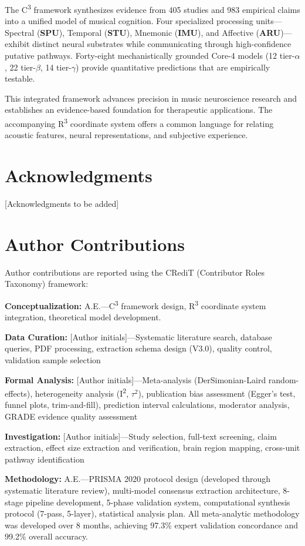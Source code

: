 \documentclass[9pt,onecolumn]{article}
\newcommand{\STU}{\textcolor{stucolor}{\textbf{STU}}}
\newcommand{\IMU}{\textcolor{imucolor}{\textbf{IMU}}}
\newcommand{\SPU}{\textcolor{spucolor}{\textbf{SPU}}}
\newcommand{\ARU}{\textcolor{arucolor}{\textbf{ARU}}}
\newcommand{\Cthree}{C\textsuperscript{3}}
\newcommand{\Rthree}{R\textsuperscript{3}}
\begin{document}
The \Cthree{} framework synthesizes evidence from 405 studies and 983 empirical claims into a unified model of musical cognition. Four specialized processing units---Spectral (\SPU{}), Temporal (\STU{}), Mnemonic (\IMU{}), and Affective (\ARU{})---exhibit distinct neural substrates while communicating through high-confidence putative pathways. Forty-eight mechanistically grounded Core-4 models (12 tier-$\alpha$, 22 tier-$\beta$, 14 tier-$\gamma$) provide quantitative predictions that are empirically testable.

This integrated framework advances precision in music neuroscience research and establishes an evidence-based foundation for therapeutic applications. The accompanying \Rthree{} coordinate system offers a common language for relating acoustic features, neural representations, and subjective experience.

\section*{Acknowledgments}

[Acknowledgments to be added]

\section*{Author Contributions}

Author contributions are reported using the CRediT (Contributor Roles Taxonomy) framework:

\textbf{Conceptualization:} A.E.---C\textsuperscript{3} framework design, R\textsuperscript{3} coordinate system integration, theoretical model development.

\textbf{Data Curation:} [Author initials]---Systematic literature search, database queries, PDF processing, extraction schema design (V3.0), quality control, validation sample selection

\textbf{Formal Analysis:} [Author initials]---Meta-analysis (DerSimonian-Laird random-effects), heterogeneity analysis (I\textsuperscript{2}, $\tau^2$), publication bias assessment (Egger's test, funnel plots, trim-and-fill), prediction interval calculations, moderator analysis, GRADE evidence quality assessment

\textbf{Investigation:} [Author initials]---Study selection, full-text screening, claim extraction, effect size extraction and verification, brain region mapping, cross-unit pathway identification

\textbf{Methodology:} A.E.---PRISMA 2020 protocol design (developed through systematic literature review), multi-model consensus extraction architecture, 8-stage pipeline development, 5-phase validation system, computational synthesis protocol (7-pass, 5-layer), statistical analysis plan. All meta-analytic methodology was developed over 8 months, achieving 97.3\% expert validation concordance and 99.2\% overall accuracy.
\end{document}
